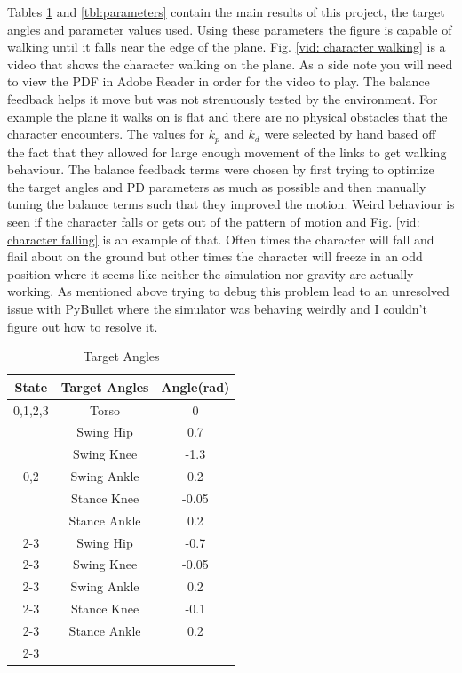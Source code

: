 \documentclass[12pt, a4paper]{article}
\begin{document}
Tables \ref{tbl: target angles} and \ref{tbl:parameters} contain the main results of this project, the target angles and parameter values used. Using these parameters the figure is capable of walking until it falls near the edge of the plane. Fig. \ref{vid: character walking} is a video that shows the character walking on the plane. As a side note you will need to view the PDF in Adobe Reader in order for the video to play. The balance feedback helps it move but was not strenuously tested by the environment. For example the plane it walks on is flat and there are no physical obstacles that the character encounters. The values for $k_p$ and $k_d$ were selected by hand based off the fact that they allowed for large enough movement of the links to get walking behaviour. The balance feedback terms were chosen by first trying to optimize the target angles and PD parameters as much as possible and then manually tuning the balance terms such that they improved the motion. Weird behaviour is seen if the character falls or gets out of the pattern of motion and Fig. \ref{vid: character falling} is an example of that. Often times the character will fall and flail about on the ground but other times the character will freeze in an odd position where it seems like neither the simulation nor gravity are actually working. As mentioned above trying to debug this problem lead to an unresolved issue with PyBullet where the simulator was behaving weirdly and I couldn't figure out how to resolve it. 
\begin{table}[ht]
\caption{Target Angles}
\begin{center}
\begin{tabular}{|c|c|c|}
\hline
State & Target Angles & Angle(rad) \\
\hline
0,1,2,3 & Torso & 0\\
\hline
\multirow{5}{*}{0,2}&Swing Hip & 0.7\\\cline{2-3}
& Swing Knee & -1.3\\ \cline{2-3}
& Swing Ankle & 0.2\\\cline{2-3}
& Stance Knee& -0.05\\\cline{2-3}
&Stance Ankle & 0.2\\\cline{2-3}
\hline
\multirow{5}{*}{1,3}&Swing Hip & -0.7\\\cline{2-3}
& Swing Knee & -0.05\\ \cline{2-3}
& Swing Ankle & 0.2\\\cline{2-3}
& Stance Knee& -0.1\\\cline{2-3}
&Stance Ankle & 0.2\\\cline{2-3}
\hline
\end{tabular}
\end{center}
\label{tbl: target angles}
\end{table}
\end{document}
